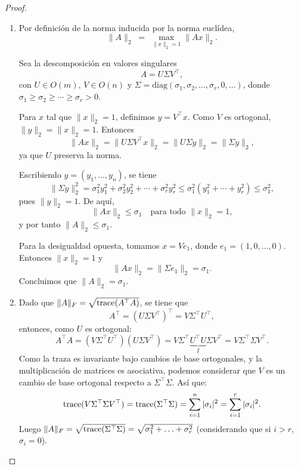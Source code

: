 \begin{proof}
	\begin{enumerate}
		\item
		      Por definición de la norma inducida por la norma euclídea,
		      \[
			      \|A\|_2 \;=\; \max_{\|x\|_2=1}\|Ax\|_2.
		      \]

		      Sea la descomposición en valores singulares
		      \[
			      A = U \Sigma V^{\top},
		      \]
		      con \(U \in O(m)\), \(V \in O(n)\) y
		      \(\Sigma=\mathrm{diag}(\sigma_1,\sigma_2,\dots,\sigma_r,0,\dots)\),
		      donde \(\sigma_1\ge \sigma_2 \ge \cdots \ge \sigma_r>0\).

		      Para \(x\) tal que \(\|x\|_2=1\), definimos \(y=V^{\top} x\). Como \(V\) es ortogonal,
		      \(\|y\|_2=\|x\|_2=1\). Entonces
		      \[
			      \|Ax\|_2
			      = \|U\Sigma V^{\top} x\|_2
			      = \|U\Sigma y\|_2
			      = \|\Sigma y\|_2,
		      \]
		      ya que \(U\) preserva la norma.

		      Escribiendo \(y=(y_1,\dots,y_n)\), se tiene
		      \[
			      \|\Sigma y\|_2^2
			      = \sigma_1^2 y_1^2 + \sigma_2^2 y_2^2 + \cdots + \sigma_r^2 y_r^2
			      \le \sigma_1^2 (y_1^2+\cdots+y_r^2)
			      \le \sigma_1^2,
		      \]
		      pues \(\|y\|_2=1\). De aquí,
		      \[
			      \|Ax\|_2 \le \sigma_1
			      \quad \text{para todo } \|x\|_2=1,
		      \]
		      y por tanto \(\|A\|_2 \le \sigma_1\).

		      Para la desigualdad opuesta, tomamos \(x=Ve_1\), donde \(e_1=(1,0,\dots,0)\).
		      Entonces \(\|x\|_2=1\) y
		      \[
			      \|Ax\|_2=\|\Sigma e_1\|_2=\sigma_1.
		      \]
		      Concluimos que \(\|A\|_2=\sigma_1\).






		\item Dado que $\lVert A\rVert_F = \sqrt{\operatorname{trace}(A^{\top}A)}$, se tiene que \[
			      A^{\top} = (U \Sigma V^{\top})^{\top} = V \Sigma^{\top} U^{\top},
		      \]
		      entonces, como $U$ es ortogonal:
		      \[
			      A^{\top} A
			      = (V \Sigma^{\top} U^{\top})(U \Sigma V^{\top})
			      = V \Sigma^{\top} \underbrace{U^{\top} U}_{I} \Sigma V^{\top}
			      = V \Sigma^{\top} \Sigma V^{\top}.
		      \]
		      Como la traza es invariante bajo cambios de base ortogonales, y la multiplicación de matrices es asociativa, podemos considerar que $V$ es un cambio de base ortogonal respecto a $\Sigma^{\top} \Sigma$. Así que:
		      \[ \operatorname{trace}(V \Sigma^{\top} \Sigma V^{\top}) = \operatorname{trace}(\Sigma^{\top} \Sigma) = \sum_{i=1}^{n} |\sigma_i|^2 = \sum_{i = 1}^{r} |\sigma_i|^2. \]
		      Luego $\lVert A\rVert_F = \sqrt{\operatorname{trace}(\Sigma^{\top}\Sigma)} = \sqrt{\sigma_1^2 + \ldots + \sigma_r^2}$ (considerando que si $i > r$, $\sigma_i = 0$).
	\end{enumerate}
\end{proof}

